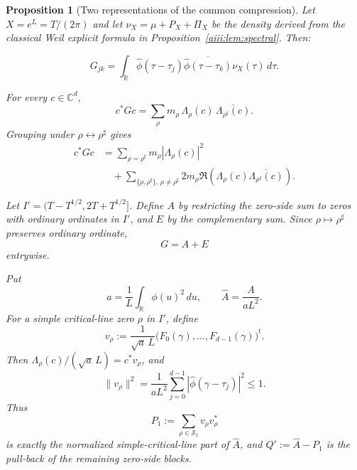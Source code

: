 \documentclass[11pt]{article}
\newtheorem{proposition}[theorem]{Proposition}
\newcommand{\R}{\mathbb R}
\newcommand{\C}{\mathbb C}
\newcommand{\cS}{\mathcal S}
\begin{document}
\begin{proposition}[Two representations of the common compression]
\label{prop:two-representations}
Let $X=e^L=T/(2\pi)$ and let $\nu_X=\mu+P_X+\Pi_X$ be the density derived
from the classical Weil explicit formula in
Proposition~\ref{aiii:lem:spectral}. Then:

\smallskip
{}
\begin{equation}\label{eq:G-spectral-common}
 G_{jk}
 =
 \int_{\R}
 \widehat\phi(\tau-\tau_j)
 \overline{\widehat\phi(\tau-\tau_k)}
 \nu_X(\tau)\,d\tau.
\end{equation}

\smallskip
{}
For every $c\in\C^d$,
\begin{equation}\label{eq:G-zero-common}
 c^*Gc
 =
 \sum_\rho m_\rho\,
 \Lambda_\rho(c)\,
 \overline{\Lambda_{\rho^\sharp}(c)}.
\end{equation}
Grouping under $\rho\leftrightarrow\rho^\sharp$ gives
\begin{align}
 c^*Gc
 &=
 \sum_{\rho=\rho^\sharp}
 m_\rho|\Lambda_\rho(c)|^2 \nonumber\\
 &\quad+
 \sum_{\{\rho,\rho^\sharp\},\,\rho\ne\rho^\sharp}
 2m_\rho\Re\!\left(
 \Lambda_\rho(c)\overline{\Lambda_{\rho^\sharp}(c)}
 \right).
 \label{eq:G-zero-blocks}
\end{align}

\smallskip
{}
Let $I'=(T-T^{1/2},2T+T^{1/2}]$. Define $A$ by restricting the zero-side
sum to zeros with ordinary ordinates in $I'$, and $E$ by the complementary
sum. Since $\rho\mapsto\rho^\sharp$ preserves ordinary ordinate,
\begin{equation}\label{eq:G-AE-common}
 G=A+E
\end{equation}
entrywise.

\smallskip
{}
Put
\[
 a=\frac1L\int_{\R}\phi(u)^2\,du,\qquad
 \widehat A=\frac{A}{aL^2}.
\]
For a simple critical-line zero $\rho$ in $I'$, define
\[
 v_\rho:=
 \frac1{\sqrt a\,L}
 \bigl(F_0(\gamma),\ldots,F_{d-1}(\gamma)\bigr)^t .
\]
Then $\Lambda_\rho(c)/(\sqrt a\,L)=c^*v_\rho$, and
\begin{equation}\label{eq:vnorm-common}
 \|v_\rho\|^2
 =
 \frac1{aL^2}\sum_{j=0}^{d-1}
 |\widehat\phi(\gamma-\tau_j)|^2
 \le1.
\end{equation}
Thus
\[
 P_1:=\sum_{\rho\in\cS_1}v_\rho v_\rho^*
\]
is exactly the normalized simple-critical-line part of $\widehat A$, and
$Q':=\widehat A-P_1$ is the pull-back of the remaining zero-side blocks.
\end{proposition}
\end{document}

